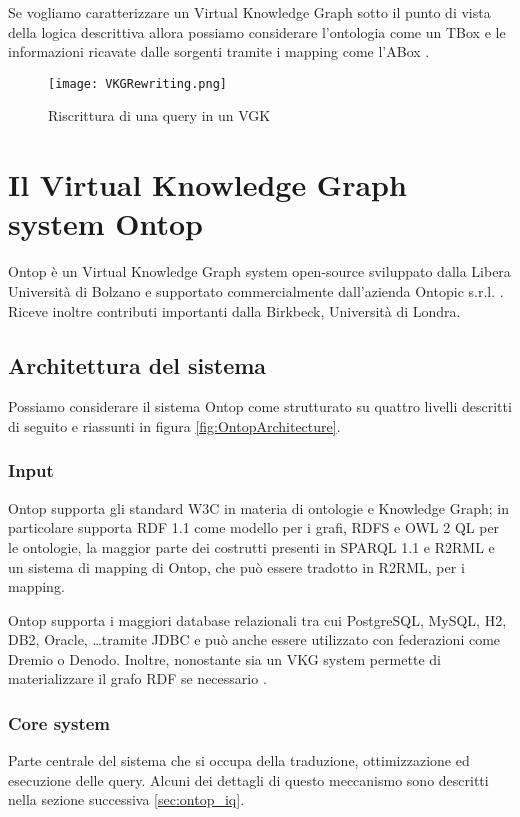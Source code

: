 Se vogliamo caratterizzare un Virtual Knowledge Graph sotto il punto di vista della logica descrittiva allora possiamo considerare l'ontologia come un TBox e le informazioni ricavate dalle sorgenti 
tramite i mapping come l'ABox \cite{OBDA} \cite{VKGOverview}. 


\begin{figure}[ht]
    \centering
    \texttt{[image: VKGRewriting.png]}
    \caption{Riscrittura di una query in un VGK}
    \label{fig:VKGRewriting}
\end{figure}


\section{Il Virtual Knowledge Graph system Ontop}
\label{sec:vkg_ontop}
Ontop è un Virtual Knowledge Graph system open-source sviluppato dalla Libera Università di Bolzano e supportato commercialmente dall'azienda Ontopic s.r.l. . 
Riceve inoltre contributi importanti dalla Birkbeck, Università di Londra.

\subsection{Architettura del sistema}
Possiamo considerare il sistema Ontop come strutturato su quattro livelli descritti di seguito e riassunti in figura \ref{fig:OntopArchitecture}.
\subsubsection*{Input}
Ontop supporta gli standard W3C in materia di ontologie e Knowledge Graph; in particolare supporta RDF 1.1 come modello per i grafi, RDFS e OWL 2 QL per le
ontologie, la maggior parte dei costrutti presenti in SPARQL 1.1 e R2RML e un sistema di mapping di Ontop, che può essere tradotto in R2RML, per i mapping.

Ontop supporta i maggiori database relazionali tra cui PostgreSQL, MySQL, H2, DB2, Oracle, \dots tramite JDBC e può anche essere utilizzato con federazioni come 
Dremio o Denodo. Inoltre, nonostante sia un VKG system permette di materializzare il grafo RDF se necessario \cite{OntopArchitecture}.

\subsubsection*{Core system}
Parte centrale del sistema che si occupa della traduzione, ottimizzazione ed esecuzione delle query. Alcuni dei dettagli di questo meccanismo sono descritti nella
sezione successiva \ref{sec:ontop_iq}.
